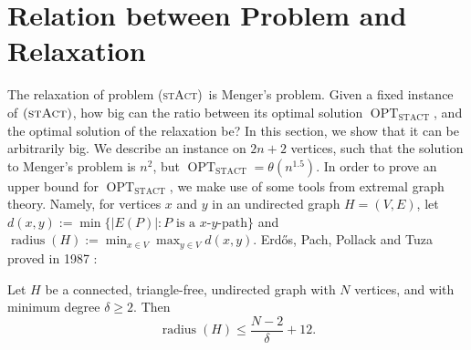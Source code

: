 \documentclass[runningheads]{llncs}
\numberwithin{equation}{section}
\newcommand{\set}[1]{\{ #1 \}}
\newcommand{\stact}{\textsc{(stAct)}}
\DeclareMathOperator{\radius}{\text{radius}}
\DeclareMathOperator{\opt}{OPT}
\newcommand{\optDirStAct}{\opt_\text{STACT}}
\begin{document}
\section{Relation between Problem and Relaxation}
\label{sec:ratio_relaxation}
The relaxation of problem \stact\ is Menger's problem. Given a fixed instance of $\stact$, how big can the ratio between its optimal solution $\optDirStAct$, and the optimal solution of the relaxation be? In this section, we show that it can be arbitrarily big. We describe an instance on $2n+2$ vertices, such that the solution to Menger's problem is $n^2$, but  $\optDirStAct = \theta(n^{1.5})$. In order to prove an upper bound for $\optDirStAct$, we make use of some tools from extremal graph theory. Namely, for vertices $x$ and $y$ in an undirected graph $H = (V, E)$, let $d(x, y) := \min\set{ |E(P)| : P \text{ is a $x$-$y$-path}}$ and $\radius(H) := \min_{x \in V} \max_{y \in V} d(x, y)$. Erd\H{o}s, Pach, Pollack and Tuza proved in 1987 \cite{erdHos1989radius}:
\begin{theorem}
\label{thm_mindegree_diameter_erdos}
Let $H$ be a connected, triangle-free, undirected graph with $N$ vertices, and with minimum degree $\delta \geq 2$. Then
\[\radius(H) \leq \frac{N-2}{\delta} + 12.\] 
\end{theorem}
\end{document}
